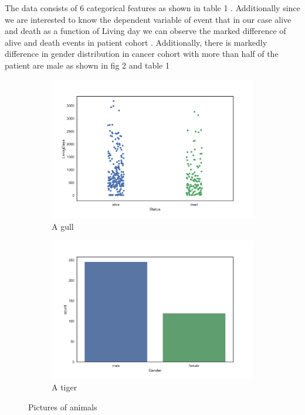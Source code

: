 \documentclass[a4paper,10pt]{article}
\begin{document}
 The data consists of 6 categorical features as shown in table 1 . Additionally since we are interested to know the dependent variable of event that in our case alive and death as a function of Living day we can observe the marked difference of alive and death events in patient cohort .  Additionally, there is markedly difference in gender distribution  in cancer cohort with more than half of the patient are male as shown in fig 2  and table 1

 
\begin{figure}[bh]
    \centering
    \begin{subfigure}[bh]{0.45\textwidth}
        \includegraphics[width=1.1\textwidth]{livingstatusandstatus.png}
        \caption{A gull}
        \label{fig:gull}
    \end{subfigure}
    \begin{subfigure}[bh]{0.45\textwidth}
        \includegraphics[width=1.1\textwidth]{GenderVSstatus.png}
          \caption{A tiger}
          \label{fig:tiger}
    \end{subfigure}
    \caption{Pictures of animals}\label{fig:animals}
\end{figure}
  

 
 	\subsection {}
	
	
	\subsection {}





\end{document}
